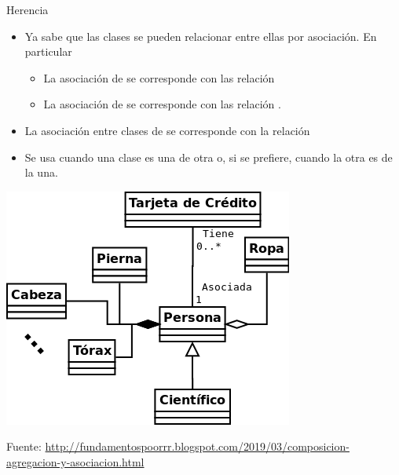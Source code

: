\documentclass[10pt,envcountsect,spanish]{beamer}
\begin{document}
\begin{frame}{Herencia} 

\begin{itemize}

\item Ya sabe que las clases se pueden relacionar entre ellas por asociación. En particular 

\begin{itemize}
\item La asociación de   se corresponde con las relación 
\item La asociación de  se corresponde con las relación  .
\end{itemize}

\item La asociación entre clases de  se corresponde con la relación 

\item Se usa cuando una clase es una  de otra o, si se prefiere, cuando la otra es  de la una.
\end{itemize}

\unEjemplo 

\centerline{\includegraphics[width=.4\textwidth]{fig/relaciones}}


\centerline{\scriptsize Fuente: \url{http://fundamentospoorrr.blogspot.com/2019/03/composicion-agregacion-y-asociacion.html}}
\end{frame}
\end{document}
